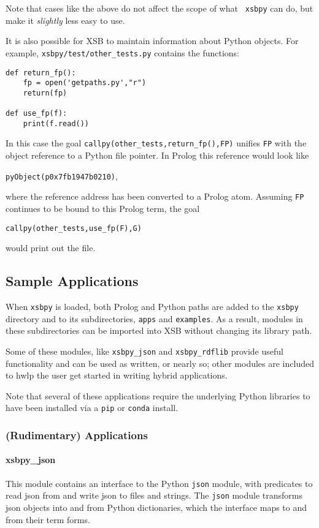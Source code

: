 \begin{example} \rm 
Note that cases like the above do not affect the scope of what {\tt
  xsbpy} can do, but make it {\em slightly} less easy to use.

It is also possible for XSB to maintain information about Python
objects.  For example, {\tt xsbpy/test/other\_tests.py} contains the
functions:

\begin{verbatim}
def return_fp():
    fp = open('getpaths.py',"r")
    return(fp)

def use_fp(f):
    print(f.read())
\end{verbatim}

In this case the goal {\tt callpy(other\_tests,return\_fp(),FP)}
unifies {\tt FP} with the object reference to a Python file pointer.
In Prolog this reference would  look like

{\tt pyObject(p0x7fb1947b0210)},

\noindent
where the reference address has been converted to a Prolog atom.
Assuming {\tt FP} continues to be bound to this Prolog term, the goal

{\tt callpy(other\_tests,use\_fp(F),G)}

\noindent
would print out the file.
\end{example}

\subsection{Sample Applications}
When {\tt xsbpy} is loaded, both Prolog and Python paths are added to
the {\tt xsbpy} directory and to its subdirectories, {\tt apps} and
{\tt examples}.  As a result, modules in these subdirectories can be
imported into XSB without changing its library path.

Some of these modules, like {\tt xsbpy\_json} and {\tt xsbpy\_rdflib}
provide useful functionality and can be used as written, or nearly so;
other modules are included to hwlp the user get started in writing
hybrid applications.

Note that several of these applications require the underlying Python
libraries to have been installed via a {\tt pip} or {\tt conda}
install.

\subsubsection{(Rudimentary) Applications}

\paragraph{xsbpy\_json}
This module contains an interface to the Python {\tt json}
module, with predicates to read json from and write json to files and
strings.  The {\tt json} module transforms json objects into and from Python
dictionaries, which the interface maps to and from their term forms.

